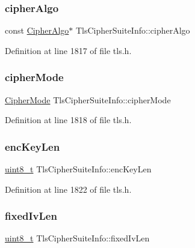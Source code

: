 \subsubsection{\texorpdfstring{cipher\+Algo}{cipherAlgo}}
{\footnotesize\ttfamily const \hyperlink{structCipherAlgo}{Cipher\+Algo}$\ast$ Tls\+Cipher\+Suite\+Info\+::cipher\+Algo}



Definition at line 1817 of file tls.\+h.

\mbox{\label{structTlsCipherSuiteInfo_a0c97190e410a53e9d5aa83d1350b967e}} 
\subsubsection{\texorpdfstring{cipher\+Mode}{cipherMode}}
{\footnotesize\ttfamily \hyperlink{cyclone__crypto_2core_2crypto_8h_ac3adaabf9bad553901589ddf3de6daf5}{Cipher\+Mode} Tls\+Cipher\+Suite\+Info\+::cipher\+Mode}



Definition at line 1818 of file tls.\+h.

\mbox{\label{structTlsCipherSuiteInfo_a2cd8770a9ef763ba4e67d2b128007cd8}} 
\subsubsection{\texorpdfstring{enc\+Key\+Len}{encKeyLen}}
{\footnotesize\ttfamily \hyperlink{stdint_8h_aba7bc1797add20fe3efdf37ced1182c5}{uint8\+\_\+t} Tls\+Cipher\+Suite\+Info\+::enc\+Key\+Len}



Definition at line 1822 of file tls.\+h.

\mbox{\label{structTlsCipherSuiteInfo_a2c6a2507984b67e38c6550630a20faef}} 
\subsubsection{\texorpdfstring{fixed\+Iv\+Len}{fixedIvLen}}
{\footnotesize\ttfamily \hyperlink{stdint_8h_aba7bc1797add20fe3efdf37ced1182c5}{uint8\+\_\+t} Tls\+Cipher\+Suite\+Info\+::fixed\+Iv\+Len}



